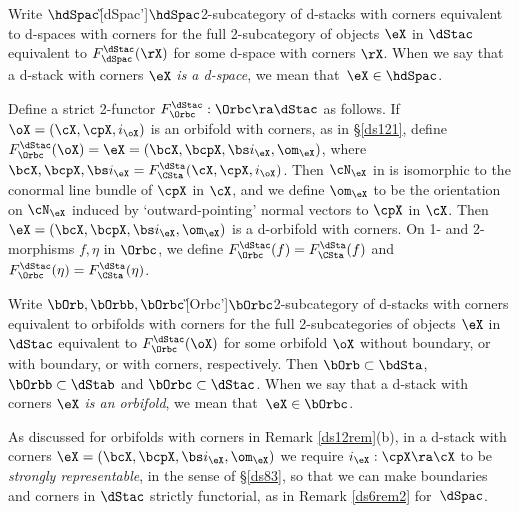 \documentclass{article}
\begin{document}
Write $\hdSpac$\G[dSpac']{$\hdSpac$}{2-subcategory of d-stacks with
corners equivalent to d-spaces with corners} for the full
2-subcategory of objects $\eX$ in $\dStac$ equivalent to
$F_\dSpac^\dStac(\rX)$ for some d-space with corners $\rX$. When we
say that a d-stack with corners $\eX$ {\it is a d-space}, we mean that~$\eX\in\hdSpac$.

Define a strict 2-functor $F_\Orbc^\dStac:\Orbc\ra\dStac$ as
follows. If $\oX=(\cX,\cpX,i_\oX)$ is an orbifold with corners, as
in \S\ref{ds121}, define $F_\Orbc^\dStac(\oX)=\eX=(\bcX,\bcpX,\bs
i_\eX,\om_\eX)$, where $\bcX,\bcpX,\bs i_\eX=F_\CSta^\dSta
(\cX,\cpX,i_\oX)$. Then $\cN_\eX$ in  is isomorphic to
the conormal line bundle of $\cpX$ in $\cX$, and we define $\om_\eX$
to be the orientation on $\cN_\eX$ induced by `outward-pointing'
normal vectors to $\cpX$ in $\cX$. Then $\eX=(\bcX,\bcpX,\bs
i_\eX,\om_\eX)$ is a d-orbifold with corners. On 1- and 2-morphisms
$f,\eta$ in $\Orbc$, we define $F_\Orbc^\dStac(f)=F_\CSta^\dSta(f)$
and~$F_\Orbc^\dStac(\eta)=F_\CSta^\dSta(\eta)$.

Write $\bOrb,\bOrbb,\bOrbc$\G[Orbc']{$\bOrbc$}{2-subcategory of
d-stacks with corners equivalent to orbifolds with corners} for the
full 2-subcategories of objects $\eX$ in $\dStac$ equivalent to
$F_\Orbc^\dStac(\oX)$ for some orbifold $\oX$ without boundary, or
with boundary, or with corners, respectively. Then
$\bOrb\subset\bdSta$, $\bOrbb\subset\dStab$ and
$\bOrbc\subset\dStac$. When we say that a d-stack with corners $\eX$
{\it is an orbifold}, we mean
that~$\eX\in\bOrbc$.

\begin{rem} As discussed for orbifolds with corners in Remark
\ref{ds12rem}(b), in a d-stack with corners $\eX=(\bcX,\bcpX,\bs
i_\eX,\om_\eX)$ we require $i_\eX:\cpX\ra\cX$ to be {\it strongly
representable}, in the sense of \S\ref{ds83}, so that we can make
boundaries and corners in $\dStac$ strictly functorial, as in Remark
\ref{ds6rem2} for~$\dSpac$.
\label{ds13rem}
\end{rem}
\end{document}
